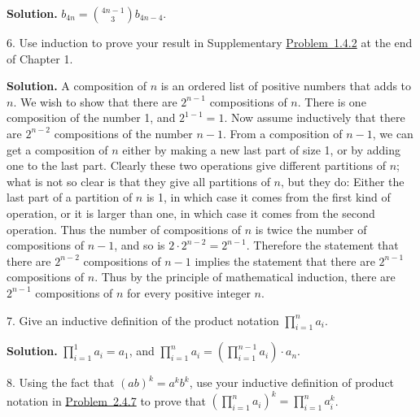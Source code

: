\documentclass[10pt,]{book}
\theoremstyle{plain}
\theoremstyle{definition}
\theoremstyle{definition}
\numberwithin{equation}{chapter}
\begin{document}
\begin{exerciselist}
\par\smallskip
\par\smallskip
\noindent\textbf{Solution.}\hypertarget{solution-184}{}\quad
\(b_{4n}=\binom{4n-1}{3}b_{4n-4}\).%
\item[6.]\hypertarget{exercise-18}{}Use induction to prove your result in Supplementary \hyperlink{composition_numberof}{Problem~1.4.2} at the end of Chapter 1.%
\par\smallskip
\par\smallskip
\noindent\textbf{Solution.}\hypertarget{solution-185}{}\quad
A composition of \(n\) is an ordered list of positive numbers that adds to \(n\). We wish to show that there are \(2^{n-1}\) compositions of \(n\). There is one composition of the number 1, and \(2^{1-1}=1\). Now assume inductively that there are \(2^{n-2}\) compositions of the number \({n-1}\). From a composition of \(n-1\), we can get a composition of \(n\) either by making a new last part of size 1, or by adding one to the last part. Clearly these two operations give different partitions of \(n\); what is not so clear is that they give all partitions of \(n\), but they do: Either the last part of a partition of \(n\) is 1, in which case it comes from the first kind of operation, or it is larger than one, in which case it comes from the second operation. Thus the number of compositions of \(n\) is twice the number of compositions of \(n-1\), and so is \(2\cdot2^{n-2}=2^{n-1}\). Therefore the statement that there are \(2^{n-2}\) compositions of \(n-1\) implies the statement that there are \(2^{n-1}\) compositions of \(n\). Thus by the principle of mathematical induction, there are \(2^{n-1}\) compositions of \(n\) for every positive integer \(n\).%
\item[7.]\hypertarget{inductiveprodnotation}{}Give an inductive definition of the product notation \(\displaystyle
\prod_{i=1}^n a_i\).%
\par\smallskip
\par\smallskip
\noindent\textbf{Solution.}\hypertarget{solution-186}{}\quad
\(\displaystyle\prod_{i=1}^1a_i=a_1\), and \(\displaystyle\prod_{i=1}^n
a_i= \left(\prod_{i=1}^{n-1}a_i\right)\cdot a_n\).%
\item[8.]\hypertarget{exercise-20}{}Using the fact that \((ab)^k =a^kb^k\), use your inductive definition of product notation in \hyperlink{inductiveprodnotation}{Problem~2.4.7} to prove that \(\displaystyle \left(\prod_{i=1}^n a_i\right)^k=\prod_{i=1}^n a_i^k\).%
\par\smallskip
\par\smallskip

\end{exerciselist}
\end{document}
